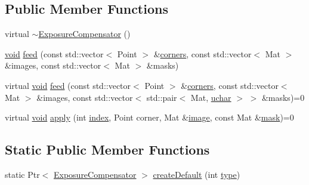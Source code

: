 \subsection*{Public Member Functions}
\begin{DoxyCompactItemize}
\item 
virtual \hyperlink{classcv_1_1detail_1_1ExposureCompensator_a06bc9258415392a147b504c1604cd0bf}{$\sim$\-Exposure\-Compensator} ()
\item 
\hyperlink{legacy_8hpp_a8bb47f092d473522721002c86c13b94e}{void} \hyperlink{classcv_1_1detail_1_1ExposureCompensator_a043e7afaa7da49a2ac33fa6d04acad5c}{feed} (const std\-::vector$<$ Point $>$ \&\hyperlink{imgproc__c_8h_a223e965e192c7025d6c6be77305f515b}{corners}, const std\-::vector$<$ Mat $>$ \&images, const std\-::vector$<$ Mat $>$ \&masks)
\item 
virtual \hyperlink{legacy_8hpp_a8bb47f092d473522721002c86c13b94e}{void} \hyperlink{classcv_1_1detail_1_1ExposureCompensator_aaf1fadcb2a10d618b7fea16930a43546}{feed} (const std\-::vector$<$ Point $>$ \&\hyperlink{imgproc__c_8h_a223e965e192c7025d6c6be77305f515b}{corners}, const std\-::vector$<$ Mat $>$ \&images, const std\-::vector$<$ std\-::pair$<$ Mat, \hyperlink{core_2types__c_8h_a65f85814a8290f9797005d3b28e7e5fc}{uchar} $>$ $>$ \&masks)=0
\item 
virtual \hyperlink{legacy_8hpp_a8bb47f092d473522721002c86c13b94e}{void} \hyperlink{classcv_1_1detail_1_1ExposureCompensator_acf91d7a60240d057c461c0db3774b73a}{apply} (int \hyperlink{core__c_8h_a750b5d744c39a06bfb13e6eb010e35d0}{index}, Point corner, Mat \&\hyperlink{legacy_8hpp_ad62b16ab219ae2483e8a3d921c44cc97}{image}, const Mat \&\hyperlink{tracking_8hpp_a6b13ecd2fd6ec7ad422f1d7863c3ad19}{mask})=0
\end{DoxyCompactItemize}
\subsection*{Static Public Member Functions}
\begin{DoxyCompactItemize}
\item 
static Ptr$<$ \hyperlink{classcv_1_1detail_1_1ExposureCompensator}{Exposure\-Compensator} $>$ \hyperlink{classcv_1_1detail_1_1ExposureCompensator_a72d0796c30091cdc686ad63ea46ebdc4}{create\-Default} (int \hyperlink{imgproc__c_8h_a84612d8738bf935200cf32a103d8efe1}{type})
\end{DoxyCompactItemize}


